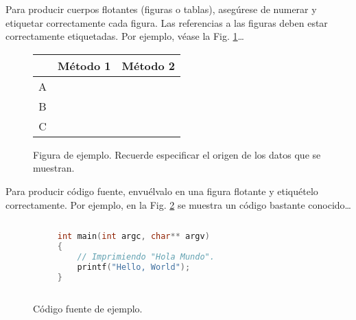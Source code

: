 \documentclass[a4paper,10pt,twocolumn]{article}
\begin{document}
Para producir cuerpos flotantes (figuras o tablas), asegúrese de numerar
y etiquetar correctamente cada figura. Las referencias a las figuras deben
estar correctamente etiquetadas. Por ejemplo, véase la Fig. \ref{fig:ex}\ldots

\begin{figure}[h!]%
	\begin{center}
		\begin{tabular}{|c|c|c|} \hline
			& Método 1 	& Método 2 	\\ \hline
			A 			&  			&  			\\ \hline
			B			& 			& 			\\ \hline
			C 			& 			&  			\\ \hline
		\end{tabular}
		\caption{Figura de ejemplo. Recuerde especificar el origen de los datos que se muestran. \label{fig:ex}}
	\end{center}
\end{figure}

Para producir código fuente, envuélvalo en una figura flotante y
etiquételo correctamente. Por ejemplo, en la Fig. \ref{fig:code}
se muestra un código bastante conocido\ldots


\begin{figure}[h!]%
	\begin{lstlisting}[language=c]%
		
     int main(int argc, char** argv)
     {
         // Imprimiendo "Hola Mundo".
         printf("Hello, World");
     }
		
	\end{lstlisting}
	\caption{Código fuente de ejemplo.\label{fig:code}}
\end{figure}



\label{end}
\end{document}

